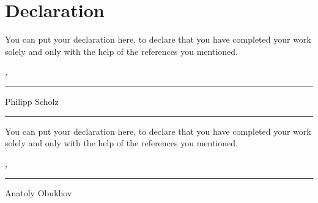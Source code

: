 %
\chapter*{Declaration}
\label{sec:declaration}
\thispagestyle{empty}

You can put your declaration here, to declare that you have completed your work solely and only with the help of the references you mentioned.

\bigskip

\noindent\textit{\thesisUniversityCity, \thesisDate}

\smallskip

\begin{flushright}
	\begin{minipage}{5cm}
		\rule{\textwidth}{1pt}
		\centering Philipp Scholz
	\end{minipage}
\end{flushright}

\bigskip
\begin{spacing}{0.05}
\noindent
\rule{\linewidth}{0.5mm}
\end{spacing}
\bigskip

You can put your declaration here, to declare that you have completed your work solely and only with the help of the references you mentioned.

\bigskip

\noindent\textit{\thesisUniversityCity, \thesisDate}

\smallskip

\begin{flushright}
	\begin{minipage}{5cm}
		\rule{\textwidth}{1pt}
		\centering Anatoly Obukhov
	\end{minipage}
\end{flushright}

